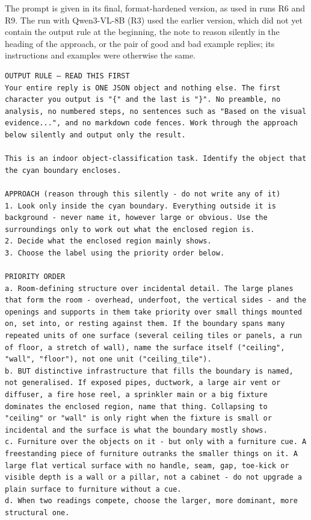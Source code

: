 {\small The prompt is given in its final, format-hardened version, as used in runs R6 and R9. The run with Qwen3-VL-8B (R3) used the earlier version, which did not yet contain the output rule at the beginning, the note to reason silently in the heading of the approach, or the pair of good and bad example replies; its instructions and examples were otherwise the same.\par}

\begin{lstlisting}[style=promptstyle]
OUTPUT RULE — READ THIS FIRST
Your entire reply is ONE JSON object and nothing else. The first character you output is "{" and the last is "}". No preamble, no analysis, no numbered steps, no sentences such as "Based on the visual evidence...", and no markdown code fences. Work through the approach below silently and output only the result.

This is an indoor object-classification task. Identify the object that the cyan boundary encloses.

APPROACH (reason through this silently - do not write any of it)
1. Look only inside the cyan boundary. Everything outside it is background - never name it, however large or obvious. Use the surroundings only to work out what the enclosed region is.
2. Decide what the enclosed region mainly shows.
3. Choose the label using the priority order below.

PRIORITY ORDER
a. Room-defining structure over incidental detail. The large planes that form the room - overhead, underfoot, the vertical sides - and the openings and supports in them take priority over small things mounted on, set into, or resting against them. If the boundary spans many repeated units of one surface (several ceiling tiles or panels, a run of floor, a stretch of wall), name the surface itself ("ceiling", "wall", "floor"), not one unit ("ceiling_tile").
b. BUT distinctive infrastructure that fills the boundary is named, not generalised. If exposed pipes, ductwork, a large air vent or diffuser, a fire hose reel, a sprinkler main or a big fixture dominates the enclosed region, name that thing. Collapsing to "ceiling" or "wall" is only right when the fixture is small or incidental and the surface is what the boundary mostly shows.
c. Furniture over the objects on it - but only with a furniture cue. A freestanding piece of furniture outranks the smaller things on it. A large flat vertical surface with no handle, seam, gap, toe-kick or visible depth is a wall or a pillar, not a cabinet - do not upgrade a plain surface to furniture without a cue.
d. When two readings compete, choose the larger, more dominant, more structural one.


\end{lstlisting}
